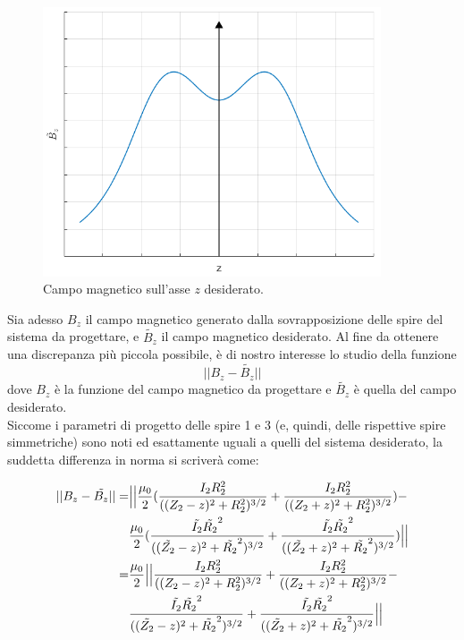 \documentclass[a4paper, 11pt]{article}
\begin{document}
\begin{figure}[H]
	\centering
	\includegraphics[width=10cm]{assets/figure3}
	\caption{Campo magnetico sull'asse $z$ desiderato.}
\end{figure}
\noindent
Sia adesso $B_{z}$ il campo magnetico generato dalla sovrapposizione delle spire
del sistema da progettare, e $\tilde{B_{z}}$ il campo magnetico desiderato. Al
fine da ottenere una discrepanza più piccola possibile, è di nostro interesse lo
studio della funzione
\[||B_{z}-\tilde{B_{z}}||\] dove $B_{z}$ è la funzione del campo magnetico da
progettare e $\tilde{B_{z}}$ è quella del campo desiderato. \\
Siccome i parametri di progetto delle spire 1 e 3 (e, quindi, delle rispettive
spire simmetriche) sono noti ed esattamente uguali a quelli del sistema
desiderato, la suddetta differenza in norma si scriverà come:

\begin{equation}
	\begin{split}
	||B_{z}-\tilde{B_{z}}||
		=& \Bigl|\Bigl|\frac{\mu_{0}}{2}(\frac{I_{2}R_{2}^{2}}{((Z_{2}-z)^{2}+R_{2}^{2})^{3/2}}+\frac{I_{2}R_{2}^{2}}{((Z_{2}+z)^{2}+R_{2}^{2})^{3/2}})- \\
		 & \frac{\mu_{0}}{2}(\frac{\tilde{I_{2}}\tilde{R_{2}}^{2}}{((\tilde{Z_{2}}-z)^{2}+\tilde{R_{2}}^{2})^{3/2}}+\frac{\tilde{I_{2}}\tilde{R_{2}}^{2}}{((\tilde{Z_{2}}+z)^{2}+\tilde{R_{2}}^{2})^{3/2}})\Bigr|\Bigr| \\
		=& \frac{\mu_{0}}{2}\Bigl|\Bigl|\frac{I_{2}R_{2}^{2}}{((Z_{2}-z)^{2}+R_{2}^{2})^{3/2}}+\frac{I_{2}R_{2}^{2}}{((Z_{2}+z)^{2}+R_{2}^{2})^{3/2}}- \\
		 & \frac{\tilde{I_{2}}\tilde{R_{2}}^{2}}{((\tilde{Z_{2}}-z)^{2}+\tilde{R_{2}}^{2})^{3/2}}+\frac{\tilde{I_{2}}\tilde{R_{2}}^{2}}{((\tilde{Z_{2}}+z)^{2}+\tilde{R_{2}}^{2})^{3/2}}\Bigr|\Bigr|
	\end{split} 
\end{equation}
\noindent
\end{document}
